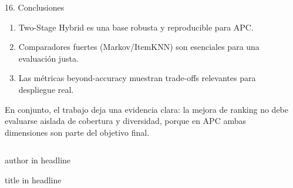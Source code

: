 \documentclass[final]{beamer}
\newlength{\sepwidth}
\newlength{\colwidth}
\newcommand{\separatorcolumn}{\begin{column}{\sepwidth}\end{column}}
\begin{document}
\begin{frame}[t]
\begin{columns}[t]
\begin{column}{\colwidth}
\vspace{0.06cm}

\begin{exampleblock}{16. Conclusiones}
\begin{enumerate}
  \item Two-Stage Hybrid es una base robusta y reproducible para APC.
  \item Comparadores fuertes (Markov/ItemKNN) son esenciales para una evaluación justa.
  \item Las métricas beyond-accuracy muestran trade-offs relevantes para despliegue real.
\end{enumerate}

\vspace{0.05cm}
En conjunto, el trabajo deja una evidencia clara: la mejora de ranking no debe evaluarse aislada de cobertura y diversidad, porque en APC ambas dimensiones son parte del objetivo final.
\end{exampleblock}

\end{column}

\separatorcolumn
\end{columns}

\vspace{0.10cm}
\begin{beamercolorbox}[wd=\textwidth,ht=0.12cm,dp=0cm]{author in headline}\end{beamercolorbox}
\vspace{0.02cm}
\begin{beamercolorbox}[wd=\textwidth,ht=0.06cm,dp=0cm]{title in headline}\end{beamercolorbox}

\end{frame}
\end{document}
